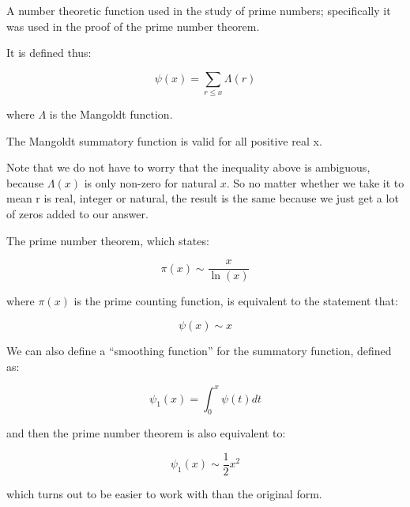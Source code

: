 \documentclass[12pt]{article}
\begin{document}
A number theoretic function used in the study of prime numbers; specifically it was used in the proof of the prime number theorem.

It is defined thus:

$$
\psi(x) = \sum_{r \leq x} \Lambda(r)
$$

where $\Lambda$ is the Mangoldt function.

The Mangoldt summatory function is valid for all positive real x.

Note that we do not have to worry that the inequality above is ambiguous, because $\Lambda(x)$ is only non-zero for natural $x$. So no matter whether we take it to mean r is real, integer or natural, the result is the same because we just get a lot of zeros added to our answer.

The prime number theorem, which states:

$$
\pi(x) \sim \frac{x}{\ln(x)}
$$

where $\pi(x)$ is the prime counting function, is equivalent to the statement that:

$$
\psi(x) \sim x
$$

We can also define a ``smoothing function'' for the summatory function, defined as:

$$
\psi_1(x) = \int_0^x \psi(t) dt
$$

and then the prime number theorem is also equivalent to:

$$
\psi_1(x) \sim \frac{1}{2} x^2
$$

which turns out to be easier to work with than the original form.
\end{document}
